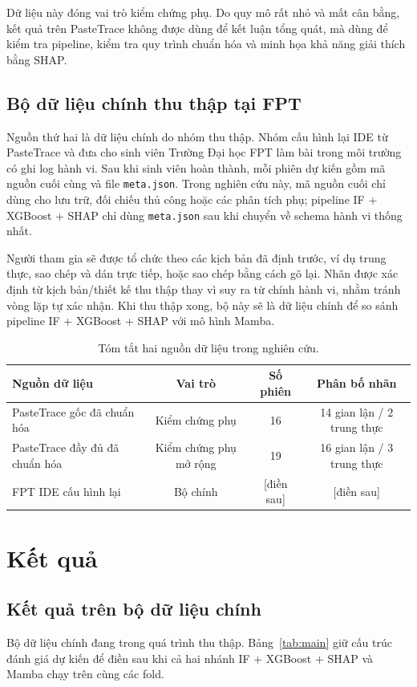 \documentclass[runningheads]{llncs}
\begin{document}
Dữ liệu này đóng vai trò kiểm chứng phụ. Do quy mô rất nhỏ và mất cân bằng, kết
quả trên PasteTrace không được dùng để kết luận tổng quát, mà dùng để kiểm tra
pipeline, kiểm tra quy trình chuẩn hóa và minh họa khả năng giải thích bằng
SHAP.

\subsection{Bộ dữ liệu chính thu thập tại FPT}
Nguồn thứ hai là dữ liệu chính do nhóm thu thập. Nhóm cấu hình lại IDE từ
PasteTrace và đưa cho sinh viên Trường Đại học FPT làm bài trong môi trường có
ghi log hành vi. Sau khi sinh viên hoàn thành, mỗi phiên dự kiến gồm mã nguồn
cuối cùng và file \texttt{meta.json}. Trong nghiên cứu này, mã nguồn cuối chỉ
dùng cho lưu trữ, đối chiếu thủ công hoặc các phân tích phụ; pipeline IF +
XGBoost + SHAP chỉ dùng \texttt{meta.json} sau khi chuyển về schema hành vi
thống nhất.

Người tham gia sẽ được tổ chức theo các kịch bản đã định trước, ví dụ trung
thực, sao chép và dán trực tiếp, hoặc sao chép bằng cách gõ lại. Nhãn được xác
định từ kịch bản/thiết kế thu thập thay vì suy ra từ chính hành vi, nhằm tránh
vòng lặp tự xác nhận. Khi thu thập xong, bộ này sẽ là dữ liệu chính để so sánh
pipeline IF + XGBoost + SHAP với mô hình Mamba.

\begin{table}[t]
\caption{Tóm tắt hai nguồn dữ liệu trong nghiên cứu.}
\label{tab:data-summary}
\centering
\begin{tabular}{lccc}
\toprule
Nguồn dữ liệu & Vai trò & Số phiên & Phân bố nhãn \\
\midrule
PasteTrace gốc đã chuẩn hóa & Kiểm chứng phụ & 16 & 14 gian lận / 2 trung thực \\
PasteTrace đầy đủ đã chuẩn hóa & Kiểm chứng phụ mở rộng & 19 & 16 gian lận / 3 trung thực \\
FPT IDE cấu hình lại & Bộ chính & [điền sau] & [điền sau] \\
\bottomrule
\end{tabular}
\end{table}

\section{Kết quả}
\label{sec:results}

\subsection{Kết quả trên bộ dữ liệu chính}
Bộ dữ liệu chính đang trong quá trình thu thập. Bảng~\ref{tab:main} giữ cấu
trúc đánh giá dự kiến để điền sau khi cả hai nhánh IF + XGBoost + SHAP và Mamba
chạy trên cùng các fold.
\end{document}
